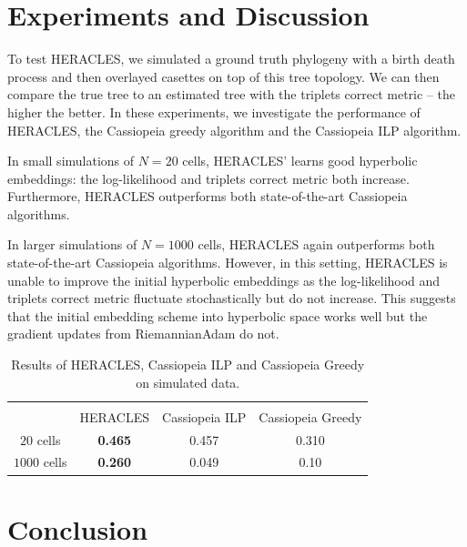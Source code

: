 \documentclass{article}
\begin{document}
\section{Experiments and Discussion}


To test HERACLES, we simulated a ground truth phylogeny with a birth death process and then overlayed casettes on top of this tree topology. We can then compare the true tree to an estimated tree with the triplets correct metric \cite{sand2013practical} -- the higher the better. In these experiments, we investigate the performance of HERACLES, the Cassiopeia greedy algorithm and the Cassiopeia ILP algorithm.

In small simulations of $N=20$ cells, HERACLES' learns good hyperbolic embeddings: the log-likelihood and triplets correct metric both increase. Furthermore, HERACLES outperforms both state-of-the-art Cassiopeia algorithms.

In larger simulations of $N=1000$ cells, HERACLES again outperforms both state-of-the-art Cassiopeia algorithms. However, in this setting, HERACLES is unable to improve the initial hyperbolic embeddings as the log-likelihood and triplets correct metric fluctuate stochastically but do not increase. This suggests that the initial embedding scheme into hyperbolic space works well but the gradient updates from RiemannianAdam do not.


\begin{table}[t]
  \label{tab:results}
  \begin{center}
    \begin{tabular}{||c c c c||} 
      \hline
        \\  & HERACLES &  Cassiopeia ILP & Cassiopeia Greedy  \\ 
      \hline\hline
      $20$ cells & \textbf{0.465}  & 0.457 & 0.310 \\ 
      \hline
      $1000$ cells & \textbf{0.260} & 0.049 & 0.10 \\
      \hline
    \end{tabular}
  \end{center}
  \caption{Results of HERACLES, Cassiopeia ILP and Cassiopeia Greedy on simulated data.}
\end{table}


\section{Conclusion}
\end{document}
